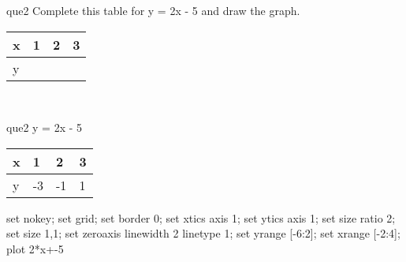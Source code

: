 \documentclass[13.5pt, varwidth=true]{beamer}
\begin{document}
\begin{frame}[shrink=19,fragile]
	\begin{beamercolorbox}[rounded=true, left, shadow=true,wd=14.8cm]{que2}
		 Complete this table for y = 2x - 5 and draw the graph. \\[0.3cm] \renewcommand{\arraystretch}{1.2}\begin{tabular}{|C|C|C|C|} \hline x & 1 & 2 & 3 \\ \hline y & & & \\ \hline \end{tabular}\\[0.3cm]
	\end{beamercolorbox}
\end{frame}
\begin{frame}[shrink=19,fragile]
	\begin{beamercolorbox}[rounded=true, left, shadow=true,wd=14.8cm]{que2}
		y = 2x - 5\renewcommand{\arraystretch}{1.2}\begin{tabular}{|C|C|C|C|} \hline x & 1 & 2 & 3 \\ \hline y & -3 & -1 & 1\\ \hline \end{tabular}\begin{gnuplot}[terminal=pdf] set nokey; set grid; set border 0; set xtics axis 1; set ytics axis 1; set size ratio 2; set size 1,1; set zeroaxis linewidth 2 linetype 1; set yrange [-6:2]; set xrange [-2:4]; plot 2*x+-5 \end{gnuplot}
	\end{beamercolorbox}
\end{frame}
\end{document}
